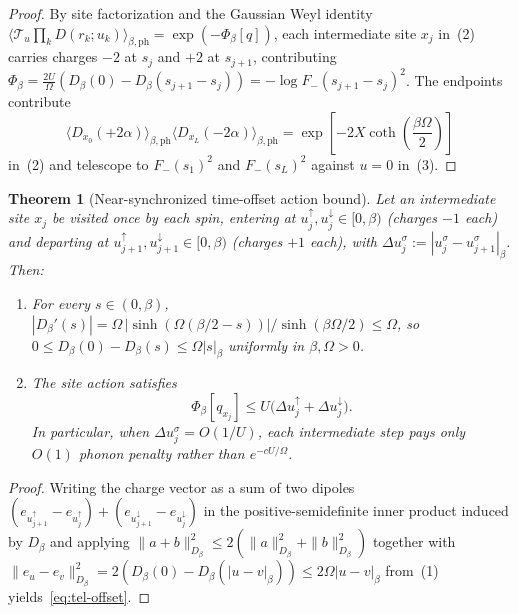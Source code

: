 \documentclass[11pt]{article}
\newtheorem{theorem}{Theorem}[section]
\theoremstyle{definition}
\theoremstyle{remark}
\begin{document}
\begin{proof}
By site factorization and the Gaussian Weyl identity
$\langle \mathcal{T}_u \prod_k D(r_k; u_k)\rangle_{\beta,\mathrm{ph}} = \exp(-\Phi_\beta[q])$,
each intermediate site $x_j$ in~(2) carries charges $-2$ at $s_j$ and $+2$ at $s_{j+1}$,
contributing $\Phi_\beta = \frac{2U}{\Omega}(D_\beta(0) - D_\beta(s_{j+1}-s_j)) = -\log F_-(s_{j+1}-s_j)^2$.
The endpoints contribute
\[
\langle D_{x_0}(+2\alpha)\rangle_{\beta,\mathrm{ph}}
\langle D_{x_L}(-2\alpha)\rangle_{\beta,\mathrm{ph}}
= \exp\!\left[-2X\coth\left(\frac{\beta\Omega}{2}\right)\right]
\]
in~(2) and telescope to $F_-(s_1)^2$ and $F_-(s_L)^2$ against $u=0$ in~(3).
\end{proof}

\begin{theorem}[Near-synchronized time-offset action bound]
\label{thm:tel-offset}
Let an intermediate site $x_j$ be visited once by each spin, entering at
$u_j^\uparrow, u_j^\downarrow \in [0,\beta)$ (charges $-1$ each) and departing
at $u_{j+1}^\uparrow, u_{j+1}^\downarrow \in [0,\beta)$ (charges $+1$ each),
with $\Delta u_j^\sigma := |u_j^\sigma - u_{j+1}^\sigma|_\beta$. Then:
\begin{enumerate}[leftmargin=1.5em]
\item For every $s \in (0,\beta)$,
$|D_\beta'(s)| = \Omega\,|\sinh(\Omega(\beta/2-s))|/\sinh(\beta\Omega/2) \le \Omega$,
so $0 \le D_\beta(0) - D_\beta(s) \le \Omega |s|_\beta$ uniformly in $\beta,\Omega > 0$.
\item The site action satisfies
\begin{equation}
\label{eq:tel-offset}
\Phi_\beta[q_{x_j}] \le U \bigl(\Delta u_j^\uparrow + \Delta u_j^\downarrow\bigr).
\end{equation}
In particular, when $\Delta u_j^\sigma = O(1/U)$, each intermediate step pays
only $O(1)$ phonon penalty rather than $e^{-c U/\Omega}$.
\end{enumerate}
\end{theorem}

\begin{proof}
Writing the charge vector as a sum of two dipoles
$(e_{u_{j+1}^\uparrow} - e_{u_j^\uparrow}) + (e_{u_{j+1}^\downarrow} - e_{u_j^\downarrow})$
in the positive-semidefinite inner product induced by $D_\beta$ and applying
$\|a + b\|_{D_\beta}^2 \le 2(\|a\|_{D_\beta}^2 + \|b\|_{D_\beta}^2)$ together
with $\|e_u - e_v\|_{D_\beta}^2 = 2(D_\beta(0) - D_\beta(|u-v|_\beta)) \le 2\Omega |u-v|_\beta$
from~(1) yields~\eqref{eq:tel-offset}.
\end{proof}
\end{document}
